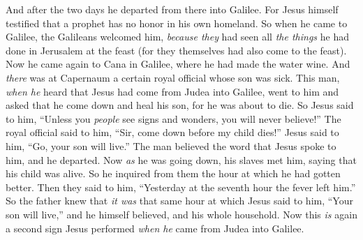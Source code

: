 \begin{biblechapter}
 And after the two days he departed from there into Galilee.
\verse For Jesus himself testified that a prophet has no honor in his own homeland.
\verse So when he came to Galilee, the Galileans welcomed him, \textit{because they} had seen all \textit{the things} he had done in Jerusalem at the feast (for they themselves had also come to the feast).
 Now he came again to Cana in Galilee, where he had made the water wine. And \textit{there} was at Capernaum a certain royal official whose son was sick.
\verse This man, \textit{when he} heard that Jesus had come from Judea into Galilee, went to him and asked that he come down and heal his son, for he was about to die.
\verse So Jesus said to him, “Unless you \textit{people} see signs and wonders, you will never believe!”
\verse The royal official said to him, “Sir, come down before my child dies!”
\verse Jesus said to him, “Go, your son will live.” The man believed the word that Jesus spoke to him, and he departed.
\verse Now \textit{as} he was going down, his slaves met him, saying that his child was alive.
\verse So he inquired from them the hour at which he had gotten better. Then they said to him, “Yesterday at the seventh hour the fever left him.”
\verse So the father knew that \textit{it was} that same hour at which Jesus said to him, “Your son will live,” and he himself believed, and his whole household.
\verse Now this \textit{is} again a second sign Jesus performed \textit{when he} came from Judea into Galilee.
\end{biblechapter}


